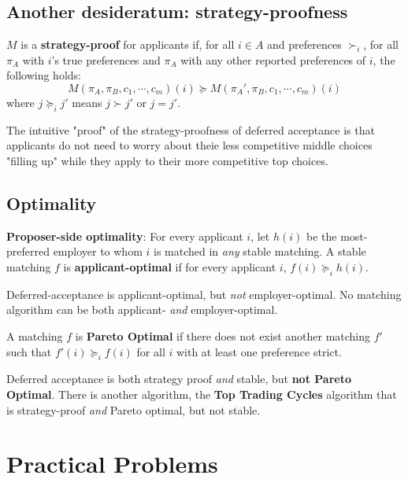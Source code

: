 \documentclass[titlepage, 12pt, leqno]{article}
\begin{document}
\subsection{Another desideratum: strategy-proofness}
\begin{definition}
    $M$ is a \textbf{strategy-proof} for applicants if, for all $i \in A$ and
    preferences $\succ_i$, for all $\pi_A$ with $i$'s true preferences and 
    $\pi_A$ with any other reported preferences of $i$, the following holds:
    \[
    M(\pi_A, \pi_B, c_1, \cdots ,c_m)(i) \succeq M(\pi_A', \pi_B, c_1, \cdots 
    ,c_m)(i)
    \]
    where $j \succeq_i j'$ means $j \succ j'$ or $j = j'$.
\end{definition}
The intuitive "proof" of the strategy-proofness of deferred acceptance is that
applicants do not need to worry about theie less competitive middle choices
"filling up" while they apply to their more competitive top choices.

\subsection{Optimality}
\begin{definition}
    \textbf{Proposer-side optimality}: For every applicant $i$, let $h(i)$ be the
    most-preferred employer to whom $i$ is matched in \textit{any} stable
    matching. A stable matching $f$ is \textbf{applicant-optimal} if for every
    applicant $i$, $f(i) \succeq_i h(i)$.
\end{definition}

Deferred-acceptance is applicant-optimal, but \textit{not} employer-optimal. No
matching algorithm can be both applicant- \textit{and} employer-optimal.

\begin{definition}
    A matching $f$ is \textbf{Pareto Optimal} if there does not exist another
    matching $f'$ such that $f'(i) \succeq_i f(i)$ for all $i$ with at least one
    preference strict.
\end{definition}

Deferred acceptance is both strategy proof \textit{and} stable, but \textbf{not
Pareto Optimal}. There is another algorithm, the \textbf{Top Trading Cycles}
algorithm that is strategy-proof \textit{and} Pareto optimal, but not
stable.

\pagebreak
\section{Practical Problems}
\end{document}
